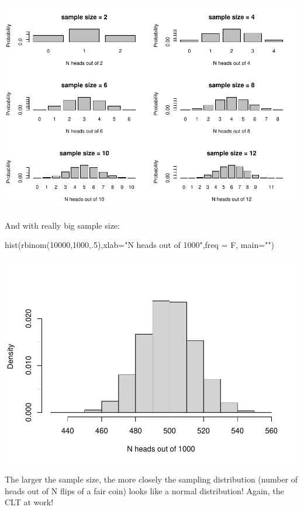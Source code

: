 \documentclass[
]{article}
\newenvironment{Shaded}{\begin{snugshade}}{\end{snugshade}}
\newcommand{\AttributeTok}[1]{\textcolor[rgb]{0.77,0.63,0.00}{#1}}
\newcommand{\DecValTok}[1]{\textcolor[rgb]{0.00,0.00,0.81}{#1}}
\newcommand{\FunctionTok}[1]{\textcolor[rgb]{0.00,0.00,0.00}{#1}}
\newcommand{\NormalTok}[1]{#1}
\newcommand{\StringTok}[1]{\textcolor[rgb]{0.31,0.60,0.02}{#1}}
\begin{document}
\includegraphics{LECTURE2_files/figure-latex/unnamed-chunk-9-1.pdf}

And with really big sample size:

\begin{Shaded}
\begin{Highlighting}[]
\FunctionTok{hist}\NormalTok{(}\FunctionTok{rbinom}\NormalTok{(}\DecValTok{10000}\NormalTok{,}\DecValTok{1000}\NormalTok{,.}\DecValTok{5}\NormalTok{),}\AttributeTok{xlab=}\StringTok{"N heads out of 1000"}\NormalTok{,}\AttributeTok{freq =}\NormalTok{ F, }\AttributeTok{main=}\StringTok{""}\NormalTok{)}
\end{Highlighting}
\end{Shaded}

\includegraphics{LECTURE2_files/figure-latex/unnamed-chunk-10-1.pdf}

The larger the sample size, the more closely the sampling distribution
(number of heads out of N flips of a fair coin) looks like a normal
distribution! Again, the CLT at work!
\end{document}
